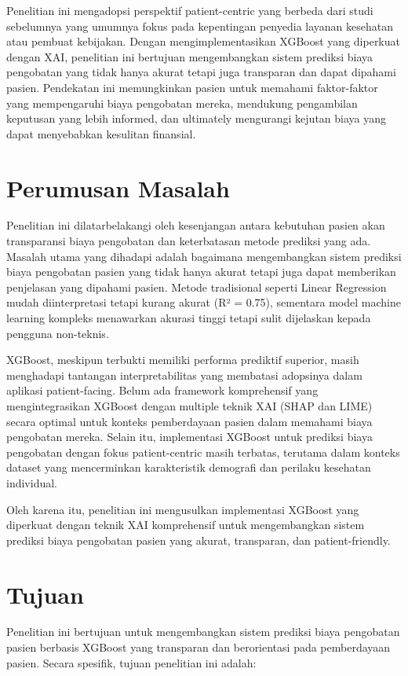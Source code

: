 Penelitian ini mengadopsi perspektif patient-centric yang berbeda dari studi sebelumnya yang umumnya fokus pada kepentingan penyedia layanan kesehatan atau pembuat kebijakan. Dengan mengimplementasikan XGBoost yang diperkuat dengan XAI, penelitian ini bertujuan mengembangkan sistem prediksi biaya pengobatan yang tidak hanya akurat tetapi juga transparan dan dapat dipahami pasien. Pendekatan ini memungkinkan pasien untuk memahami faktor-faktor yang mempengaruhi biaya pengobatan mereka, mendukung pengambilan keputusan yang lebih informed, dan ultimately mengurangi kejutan biaya yang dapat menyebabkan kesulitan finansial.

\section{Perumusan Masalah}
Penelitian ini dilatarbelakangi oleh kesenjangan antara kebutuhan pasien akan transparansi biaya pengobatan dan keterbatasan metode prediksi yang ada. Masalah utama yang dihadapi adalah bagaimana mengembangkan sistem prediksi biaya pengobatan pasien yang tidak hanya akurat tetapi juga dapat memberikan penjelasan yang dipahami pasien. Metode tradisional seperti Linear Regression mudah diinterpretasi tetapi kurang akurat (R² = 0.75), sementara model machine learning kompleks menawarkan akurasi tinggi tetapi sulit dijelaskan kepada pengguna non-teknis. 

XGBoost, meskipun terbukti memiliki performa prediktif superior, masih menghadapi tantangan interpretabilitas yang membatasi adopsinya dalam aplikasi patient-facing. Belum ada framework komprehensif yang mengintegrasikan XGBoost dengan multiple teknik XAI (SHAP dan LIME) secara optimal untuk konteks pemberdayaan pasien dalam memahami biaya pengobatan mereka. Selain itu, implementasi XGBoost untuk prediksi biaya pengobatan dengan fokus patient-centric masih terbatas, terutama dalam konteks dataset yang mencerminkan karakteristik demografi dan perilaku kesehatan individual.

Oleh karena itu, penelitian ini mengusulkan implementasi XGBoost yang diperkuat dengan teknik XAI komprehensif untuk mengembangkan sistem prediksi biaya pengobatan pasien yang akurat, transparan, dan patient-friendly.

\section{Tujuan}

Penelitian ini bertujuan untuk mengembangkan sistem prediksi biaya pengobatan pasien berbasis XGBoost yang transparan dan berorientasi pada pemberdayaan pasien. Secara spesifik, tujuan penelitian ini adalah:

